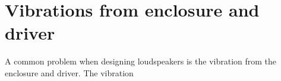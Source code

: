 \section{Vibrations from enclosure and driver}

A common problem when designing loudspeakers is the vibration from the enclosure and driver. The vibration 


